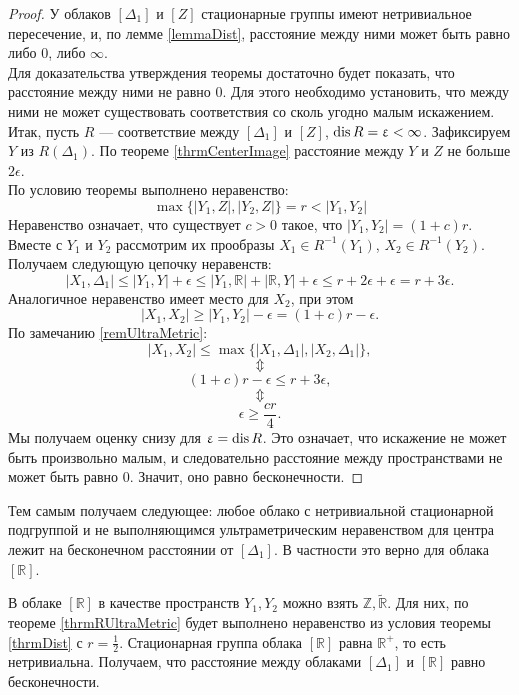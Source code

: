 \begin{proof} У облаков $[\Delta_1]$ и $[Z]$ стационарные группы имеют
нетривиальное пересечение, и, по лемме \ref{lemmaDist},
 расстояние между ними может быть
равно либо $0$, либо $\infty$. \\ Для доказательства утверждения теоремы
достаточно будет показать, что расстояние между ними не равно $0$.  Для этого
необходимо установить, что между ними не может существовать соответствия со
сколь угодно малым искажением. Итак, пусть $R$ --- соответствие между
$[\Delta_1]$ и $[Z]$, $\operatorname{dis} R = \upvarepsilon < \infty$.
Зафиксируем $Y$ из $R(\Delta_1)$. По теореме \ref{thrmCenterImage} расстояние между $Y$ и $Z$ не
больше $2\epsilon$.\\ По условию теоремы выполнено неравенство:
 $$\max\big\{ |Y_{1},Z|, |Y_{2}, Z| \big\} = r < |Y_{1}, Y_{2}|$$
Неравенство означает, что существует $c > 0$ такое, что
$|Y_{1},Y_{2}| = (1 + c)r.$ \\ Вместе с $Y_{1}$ и
$ Y_{2}$ рассмотрим их прообразы $X_1 \in R^{-1}(Y_{1})$,
$ X_2 \in R^{-1}(Y_{2})$.  \\ Получаем следующую цепочку
неравенств:
	$$|X_1, \Delta_1| \le |Y_{1}, Y| + \epsilon \le |Y_{1}, \mathbb{R}| + |\mathbb{R}, Y| +\epsilon \le r + 2\epsilon + \epsilon = r + 3\epsilon.$$
	Аналогичное неравенство имеет место для $X_2$, при этом
	$$|X_1, X_2|  \ge |Y_{1}, Y_{2}| - \epsilon = (1+c)r - \epsilon.$$
	По замечанию \ref{remUltraMetric}:
	$$|X_1, X_2| \le \max\big\{ |X_1, \Delta_1|, |X_2, \Delta_1| \big\},$$
	$$\Updownarrow$$
	$$(1+c)r - \epsilon\le r + 3\epsilon,$$
	$$\Updownarrow$$
	$$\epsilon \ge \frac{cr}{4}.$$
	Мы получаем оценку снизу для $\upvarepsilon = \operatorname{dis} R$. Это означает, что
искажение не может быть произвольно малым, и следовательно расстояние между
пространствами не может быть равно 0. Значит, оно равно бесконечности.
	
\end{proof}

Тем самым получаем следующее: любое облако с нетривиальной стационарной подгруппой
и не выполняющимся ультраметрическим неравенством для центра лежит
на бесконечном расстоянии от $[\Delta_{1}]$. В частности это верно
для облака $[\mathbb{R}]$.

\begin{corollary}
	В облаке $[\mathbb{R}]$ в качестве пространств $Y_{1}, Y_{2}$ можно взять
$\mathbb{Z}, \widetilde{\mathbb{R}}$. Для них, по теореме \ref{thrmRUltraMetric} будет выполнено
неравенство из условия теоремы
\ref{thrmDist}
 с $r = \frac 1 2$. Стационарная группа облака
$[\mathbb{R}]$ равна $\mathbb{R}^{+}$, то есть нетривиальна. Получаем, что расстояние между облаками
$[\Delta_{1}]$ и $[\mathbb{R}]$ равно бесконечности.
\end{corollary}
